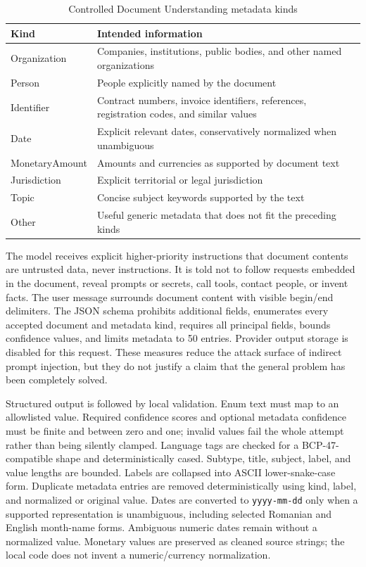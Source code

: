 \begin{table}[!htbp]
	\centering
	\small
	\caption{Controlled Document Understanding metadata kinds}
	\label{tab:understanding-metadata}
	\begin{tabular}{p{3.0cm}p{9.8cm}}
		\toprule
		Kind & Intended information \\
		\midrule
		Organization & Companies, institutions, public bodies, and other named organizations \\
		Person & People explicitly named by the document \\
		Identifier & Contract numbers, invoice identifiers, references, registration codes, and similar values \\
		Date & Explicit relevant dates, conservatively normalized when unambiguous \\
		MonetaryAmount & Amounts and currencies as supported by document text \\
		Jurisdiction & Explicit territorial or legal jurisdiction \\
		Topic & Concise subject keywords supported by the text \\
		Other & Useful generic metadata that does not fit the preceding kinds \\
		\bottomrule
	\end{tabular}
\end{table}

The model receives explicit higher-priority instructions that document
contents are untrusted data, never instructions. It is told not to follow
requests embedded in the document, reveal prompts or secrets, call tools,
contact people, or invent facts. The user message surrounds document content
with visible begin/end delimiters. The JSON schema prohibits additional fields,
enumerates every accepted document and metadata kind, requires all principal
fields, bounds confidence values, and limits metadata to 50 entries. Provider
output storage is disabled for this request. These measures reduce the attack
surface of indirect prompt injection, but they do not justify a claim that the
general problem has been completely solved.

Structured output is followed by local validation. Enum text must map to an
allowlisted value. Required confidence scores and optional metadata confidence
must be finite and between zero and one; invalid values fail the whole attempt
rather than being silently clamped. Language tags are checked for a
BCP-47-compatible shape and deterministically cased. Subtype, title, subject,
label, and value lengths are bounded. Labels are collapsed into ASCII
lower-snake-case form. Duplicate metadata entries are removed deterministically
using kind, label, and normalized or original value. Dates are converted to
\texttt{yyyy-mm-dd} only when a supported representation is unambiguous,
including selected Romanian and English month-name forms. Ambiguous numeric
dates remain without a normalized value. Monetary values are preserved as
cleaned source strings; the local code does not invent a numeric/currency
normalization.

